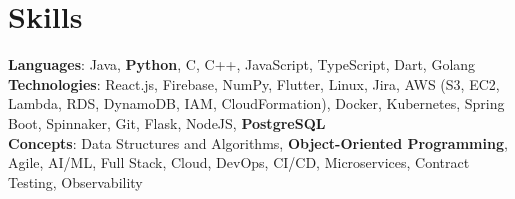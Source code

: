 \documentclass[letterpaper,11pt]{article}
\begin{document}
\section{Skills}
 \begin{itemize}[leftmargin=0.15in, label={}]
    \small{\item{
     \textbf{Languages}{: Java, \textbf{Python}, C, C++, JavaScript, TypeScript, Dart, Golang} \\
     \textbf{Technologies}{: React.js, Firebase, NumPy, Flutter, Linux, Jira, AWS (S3, EC2, Lambda, RDS, DynamoDB, IAM, CloudFormation), Docker, Kubernetes, Spring Boot, Spinnaker, Git, Flask, NodeJS, \textbf{PostgreSQL}} \\
     \textbf{Concepts}{: Data Structures and Algorithms, \textbf{Object-Oriented Programming}, Agile, AI/ML, Full Stack, Cloud, DevOps, CI/CD, Microservices, Contract Testing, Observability} }}
 \end{itemize}
\end{document}
